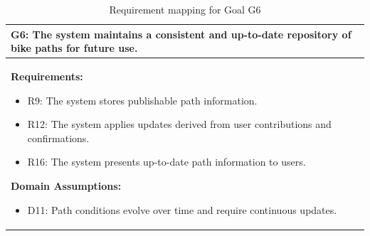 \begin{table}[H]
\centering
\renewcommand{\arraystretch}{1.2}
\begin{tabular}{|p{}|}
\hline
\textbf{G6:} The system maintains a consistent and up-to-date repository of bike
paths for future use. \\ \hline

\textbf{Requirements:}
\begin{itemize}
  \item R9: The system stores publishable path information.
  \item R12: The system applies updates derived from user contributions and confirmations.
  \item R16: The system presents up-to-date path information to users.
\end{itemize}

\textbf{Domain Assumptions:}
\begin{itemize}
  \item D11: Path conditions evolve over time and require continuous updates.
\end{itemize}
\\ \hline
\end{tabular}
\caption{Requirement mapping for Goal G6}
\end{table}

